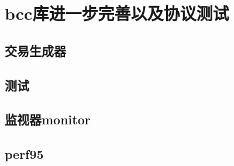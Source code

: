\chapter{bcc库进一步完善以及协议测试}

\section{交易生成器}

\section{测试}

\section{监视器monitor}

\section{perf95}

\section{}
